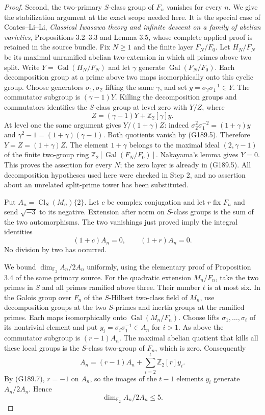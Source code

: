 \begin{proof}
Second, the two-primary $S$-class group of $F_n$ vanishes for
every $n$.  We give the stabilization argument at the exact
scope needed here.  It is the special case of Coates--Li--Li,
\emph{Classical Iwasawa theory and infinite descent on a family
of abelian varieties}, Propositions 3.2--3.3 and Lemma 3.5,
whose complete applied proof is retained in the source bundle.
Fix $N\geq1$ and the finite layer $F_N/F_0$.  Let $H_N/F_N$ be its maximal
unramified abelian two-extension in which all primes above two
split.  Write $Y=\operatorname{Gal}(H_N/F_N)$ and let
$\gamma$ generate $\operatorname{Gal}(F_N/F_0)$.
Each decomposition group at a prime above two maps isomorphically
onto this cyclic group.  Choose generators $\sigma_1,\sigma_2$
lifting the same $\gamma$, and set $y=\sigma_2\sigma_1^{-1}\in Y$.
The commutator subgroup is $(\gamma-1)Y$.
Killing the decomposition groups and commutators identifies the
$S$-class group at level zero with $Y/Z$, where
\[
 Z=(\gamma-1)Y+\mathbb Z_2[\gamma]y.
\]
At level one the same argument gives $Y/(1+\gamma)Z$:
indeed $\sigma_2^2\sigma_1^{-2}=(1+\gamma)y$ and
$\gamma^2-1=(1+\gamma)(\gamma-1)$.
Both quotients vanish by (G189.5).  Therefore
$Y=Z=(1+\gamma)Z$.
The element $1+\gamma$ belongs to the maximal ideal
$(2,\gamma-1)$ of the finite two-group ring
$\mathbb Z_2[\operatorname{Gal}(F_N/F_0)]$.
Nakayama's lemma gives $Y=0$.
This proves the assertion for every $N$; the zero layer is already
in (G189.5).  All decomposition hypotheses used here were checked
in Step 2, and no assertion about an unrelated split-prime tower
has been substituted.

Put $A_n=\operatorname{Cl}_S(M_n)\{2\}$.
Let $c$ be complex conjugation and let $r$ fix $F_n$ and send
$\sqrt{-3}$ to its negative.  Extension after norm on $S$-class
groups is the sum of the two automorphisms.  The two vanishings
just proved imply the integral identities
\[
                  (1+c)A_n=0,\qquad(1+r)A_n=0.
 \tag{G189.7}
\]
No division by two has occurred.

We bound $\dim_{\mathbb F_2}A_n/2A_n$ uniformly, using the
elementary proof of Proposition 3.4 of the same primary source.
For the quadratic extension $M_n/F_n$, take the two primes in
$S$ and all primes ramified above three.  Their number $t$ is
at most six.  In the Galois group over $F_n$ of the $S$-Hilbert
two-class field of $M_n$, use decomposition groups at the two
$S$-primes and inertia groups at the ramified primes.
Each maps isomorphically onto $\operatorname{Gal}(M_n/F_n)$.
Choose lifts $\sigma_1,\ldots,\sigma_t$ of its nontrivial element
and put $y_i=\sigma_i\sigma_1^{-1}\in A_n$ for $i>1$.
As above the commutator subgroup is $(r-1)A_n$.
The maximal abelian quotient that kills all these local groups
is the $S$-class two-group of $F_n$, which is zero.
Consequently
\[
 A_n=(r-1)A_n+
             \sum_{i=2}^t\mathbb Z_2[r]y_i.
\]
By (G189.7), $r=-1$ on $A_n$, so the images of the $t-1$
elements $y_i$ generate $A_n/2A_n$.  Hence
\[
                   \dim_{\mathbb F_2}A_n/2A_n\leq5.
 \tag{G189.8}
\]


\end{proof}
